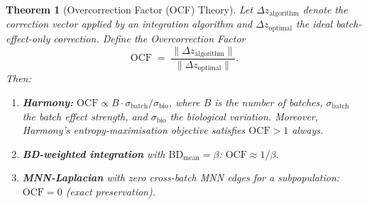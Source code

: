 \documentclass[10pt]{article}
\newtheorem{theorem}{Theorem}
\begin{document}
\begin{theorem}[Overcorrection Factor (OCF) Theory]
\label{thm:ocf}
Let $\Delta z_{\mathrm{algorithm}}$ denote the correction vector applied by
an integration algorithm and $\Delta z_{\mathrm{optimal}}$ the ideal
batch-effect-only correction.  Define the \emph{Overcorrection Factor}
\[
    \mathrm{OCF}
    \;=\; \frac{\|\Delta z_{\mathrm{algorithm}}\|}
               {\|\Delta z_{\mathrm{optimal}}\|}.
\]
Then:
\begin{enumerate}
\item[\textup{(a)}] \textbf{Harmony:}
$\mathrm{OCF} \propto B \cdot \sigma_{\mathrm{batch}} / \sigma_{\mathrm{bio}}$,
where $B$ is the number of batches, $\sigma_{\mathrm{batch}}$ the batch
effect strength, and $\sigma_{\mathrm{bio}}$ the biological variation.
Moreover, Harmony's entropy-maximisation objective satisfies
$\mathrm{OCF} > 1$ always.

\item[\textup{(b)}] \textbf{BD-weighted integration} with
$\mathrm{BD}_{\mathrm{mean}} = \beta$:
$\mathrm{OCF} \approx 1/\beta$.

\item[\textup{(c)}] \textbf{MNN-Laplacian} with zero cross-batch MNN edges
for a subpopulation: $\mathrm{OCF} = 0$ (exact preservation).
\end{enumerate}
\end{theorem}
\end{document}
